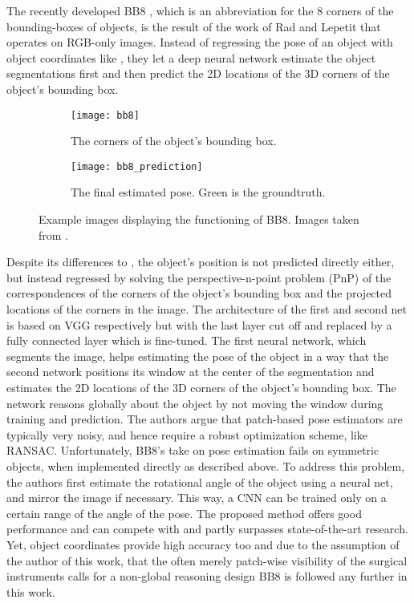 The recently developed BB8 \cite{bb8}, which is an abbreviation for the 8 corners of the bounding-boxes of objects, is the result of the work of Rad and Lepetit that operates on RGB-only images. Instead of regressing the pose of an object with object coordinates like \cite{brachmann1}, they let a deep neural network estimate the object segmentations first and then predict the 2D locations of the 3D corners of the object's bounding box. 
\nnewline
\begin{figure}[!tbp]
	\centering
	\begin{subfigure}[b]{0.45\textwidth}
		\centering
    	\texttt{[image: bb8]}
    	\caption{The corners of the object's bounding box.}
	\end{subfigure}
	\hfill
	\begin{subfigure}[b]{0.45\textwidth}
		\centering
    	\texttt{[image: bb8\_prediction]}
    	\caption{The final estimated pose. Green is the groundtruth.}
	\end{subfigure}
	\caption{Example images displaying the functioning of BB8. Images taken from \cite{bb8}.}
\end{figure} 
\noindent
Despite its differences to \cite{brachmann1}, the object's position is not predicted directly either, but instead regressed by solving the perspective-n-point problem (PnP) of the correspondences of the corners of the object's bounding box and the projected locations of the corners in the image. The architecture of the first and second net is based on VGG \cite{vgg} respectively but with the last layer cut off and replaced by a fully connected layer which is fine-tuned. 
\nnewline
The first neural network, which segments the image, helps estimating the pose of the object in a way that the second network positions its window at the center of the segmentation and estimates the 2D locations of the 3D corners of the object's bounding box. The network reasons globally about the object by not moving the window during training and prediction. The authors argue that patch-based pose estimators are typically very noisy, and hence require a robust optimization scheme, like RANSAC. 
\nnewline
Unfortunately, BB8's take on pose estimation fails on symmetric objects, when implemented directly as described above. To address this problem, the authors first estimate the rotational angle of the object using a neural net, and mirror the image if necessary. This way, a CNN can be trained only on a certain range of the angle of the pose.
\nnewline
The proposed method offers good performance and can compete with and partly surpasses state-of-the-art research. Yet, object coordinates provide high accuracy too and due to the assumption of the author of this work, that the often merely patch-wise visibility of the surgical instruments calls for a non-global reasoning design BB8 is followed any further in this work.

